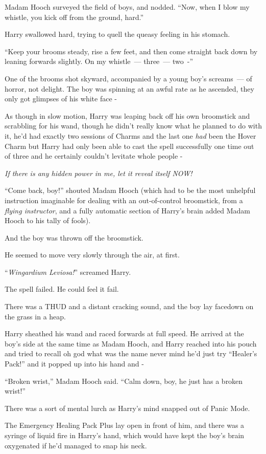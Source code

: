 Madam Hooch surveyed the field of boys, and nodded. ``Now, when I blow my whistle, you kick off from the ground, hard.''

Harry swallowed hard, trying to quell the queasy feeling in his stomach.

``Keep your brooms steady, rise a few feet, and then come straight back down by leaning forwards slightly. On my whistle~--- three~--- two~-''

One of the brooms shot skyward, accompanied by a young boy's screams~--- of horror, not delight. The boy was spinning at an awful rate as he ascended, they only got glimpses of his white face -

As though in slow motion, Harry was leaping back off his own broomstick and scrabbling for his wand, though he didn't really know what he planned to do with it, he'd had exactly two sessions of Charms and the last one \emph{had} been the Hover Charm but Harry had only been able to cast the spell successfully one time out of three and he certainly couldn't levitate whole people -

\emph{If there is any hidden power in me, let it reveal itself NOW!}

``Come back, boy!'' shouted Madam Hooch (which had to be the most unhelpful instruction imaginable for dealing with an out-of-control broomstick, from a \emph{flying instructor}, and a fully automatic section of Harry's brain added Madam Hooch to his tally of fools).

And the boy was thrown off the broomstick.

He seemed to move very slowly through the air, at first.

``\emph{Wingardium Leviosa!}'' screamed Harry.

The spell failed. He could feel it fail.

There was a THUD and a distant cracking sound, and the boy lay facedown on the grass in a heap.

Harry sheathed his wand and raced forwards at full speed. He arrived at the boy's side at the same time as Madam Hooch, and Harry reached into his pouch and tried to recall oh god what was the name never mind he'd just try ``Healer's Pack!'' and it popped up into his hand and -

``Broken wrist,'' Madam Hooch said. ``Calm down, boy, he just has a broken wrist!''

There was a sort of mental lurch as Harry's mind snapped out of Panic Mode.

The Emergency Healing Pack Plus lay open in front of him, and there was a syringe of liquid fire in Harry's hand, which would have kept the boy's brain oxygenated if he'd managed to snap his neck.

